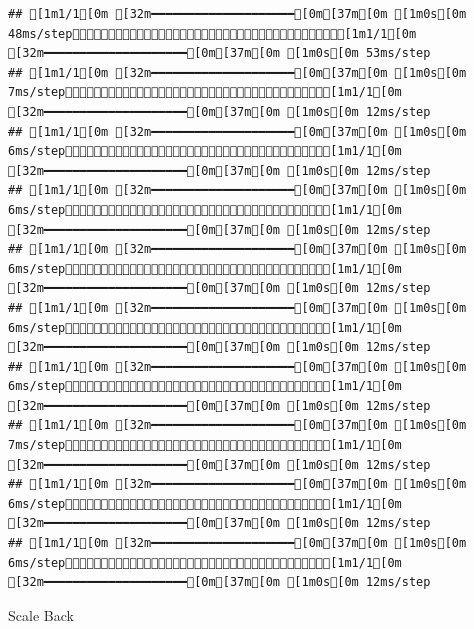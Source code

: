 \documentclass[
]{article}
\begin{document}
\begin{verbatim}
## [1m1/1[0m [32m━━━━━━━━━━━━━━━━━━━━[0m[37m[0m [1m0s[0m 48ms/step[1m1/1[0m [32m━━━━━━━━━━━━━━━━━━━━[0m[37m[0m [1m0s[0m 53ms/step
## [1m1/1[0m [32m━━━━━━━━━━━━━━━━━━━━[0m[37m[0m [1m0s[0m 7ms/step[1m1/1[0m [32m━━━━━━━━━━━━━━━━━━━━[0m[37m[0m [1m0s[0m 12ms/step
## [1m1/1[0m [32m━━━━━━━━━━━━━━━━━━━━[0m[37m[0m [1m0s[0m 6ms/step[1m1/1[0m [32m━━━━━━━━━━━━━━━━━━━━[0m[37m[0m [1m0s[0m 12ms/step
## [1m1/1[0m [32m━━━━━━━━━━━━━━━━━━━━[0m[37m[0m [1m0s[0m 6ms/step[1m1/1[0m [32m━━━━━━━━━━━━━━━━━━━━[0m[37m[0m [1m0s[0m 12ms/step
## [1m1/1[0m [32m━━━━━━━━━━━━━━━━━━━━[0m[37m[0m [1m0s[0m 6ms/step[1m1/1[0m [32m━━━━━━━━━━━━━━━━━━━━[0m[37m[0m [1m0s[0m 12ms/step
## [1m1/1[0m [32m━━━━━━━━━━━━━━━━━━━━[0m[37m[0m [1m0s[0m 6ms/step[1m1/1[0m [32m━━━━━━━━━━━━━━━━━━━━[0m[37m[0m [1m0s[0m 12ms/step
## [1m1/1[0m [32m━━━━━━━━━━━━━━━━━━━━[0m[37m[0m [1m0s[0m 6ms/step[1m1/1[0m [32m━━━━━━━━━━━━━━━━━━━━[0m[37m[0m [1m0s[0m 12ms/step
## [1m1/1[0m [32m━━━━━━━━━━━━━━━━━━━━[0m[37m[0m [1m0s[0m 7ms/step[1m1/1[0m [32m━━━━━━━━━━━━━━━━━━━━[0m[37m[0m [1m0s[0m 12ms/step
## [1m1/1[0m [32m━━━━━━━━━━━━━━━━━━━━[0m[37m[0m [1m0s[0m 6ms/step[1m1/1[0m [32m━━━━━━━━━━━━━━━━━━━━[0m[37m[0m [1m0s[0m 12ms/step
## [1m1/1[0m [32m━━━━━━━━━━━━━━━━━━━━[0m[37m[0m [1m0s[0m 6ms/step[1m1/1[0m [32m━━━━━━━━━━━━━━━━━━━━[0m[37m[0m [1m0s[0m 12ms/step
\end{verbatim}

Scale Back
\end{document}
